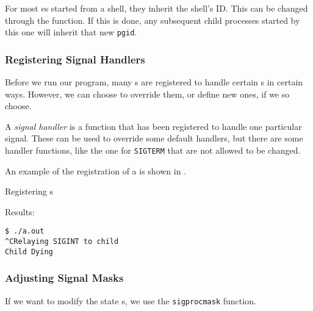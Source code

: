 \begin{remark*}
  For most es started from a shell, they inherit the shell's  ID.\@
  This can be changed through the  function.
  If this is done, any subsequent child processes started by this one will inherit that new \texttt{pgid}.
\end{remark*}

\subsubsection{Registering Signal Handlers}\label{subsubsec:Register_Signal_Handlers}
Before we run our program, many s are registered to handle certain s in certain ways.
However, we can choose to override them, or define new ones, if we so choose.

\begin{definition}\label{def:Signal_Handler}
  A \emph{signal handler} is a function that has been registered to handle one particular signal.
  These can be used to override some default handlers, but there are some handler functions, like the one for \texttt{SIGTERM} that are not allowed to be changed.
\end{definition}

An example of the registration of a  is shown in .

\begin{listing}[h!tbp]
\caption{Registering s}
\label{lst:Register_Signal_Handler}

Results:
\begin{verbatim}
$ ./a.out
^CRelaying SIGINT to child
Child Dying
\end{verbatim}
\end{listing}

\subsubsection{Adjusting Signal Masks}\label{subsubsec:Adjusting_Signal_Masks}
If we want to modify the  state s, we use the \texttt{sigprocmask} function.

